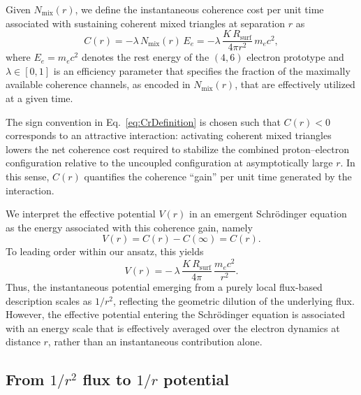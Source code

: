 \documentclass[11pt,a4paper]{article}
\begin{document}
Given $N_{\mathrm{mix}}(r)$, we define the instantaneous coherence cost per unit time associated with sustaining coherent mixed triangles at separation $r$ as
\begin{equation}
C(r) = -\lambda\,N_{\mathrm{mix}}(r)\,E_e = -\lambda\,\frac{K\,R_{\mathrm{surf}}}{4\pi r^{2}}\,m_e c^{2},
\label{eq:CrDefinition}
\end{equation}
where $E_e = m_e c^{2}$ denotes the rest energy of the $(4,6)$ electron prototype and $\lambda \in [0,1]$ is an efficiency parameter that specifies the fraction of the maximally available coherence channels, as encoded in $N_{\mathrm{mix}}(r)$, that are effectively utilized at a given time.\par The sign convention in Eq.~\eqref{eq:CrDefinition} is chosen such that $C(r)<0$ corresponds to an attractive interaction: activating coherent mixed triangles lowers the net coherence cost required to stabilize the combined proton–electron configuration relative to the uncoupled configuration at asymptotically large $r$. In this sense, $C(r)$ quantifies the coherence ``gain'' per unit time generated by the interaction.\par We interpret the effective potential $V(r)$ in an emergent Schr\"odinger equation as the energy associated with this coherence gain, namely
\begin{equation}
V(r) = C(r) - C(\infty) = C(r).
\label{eq:VrEqualsCr}
\end{equation}
To leading order within our ansatz, this yields
\begin{equation}
V(r) = -\,\lambda\,\frac{K\,R_{\mathrm{surf}}}{4\pi}\,\frac{m_e c^{2}}{r^{2}}.
\label{eq:Vr1overr2}
\end{equation}
Thus, the instantaneous potential emerging from a purely local flux-based description scales as $1/r^{2}$, reflecting the geometric dilution of the underlying flux. However, the effective potential entering the Schr\"odinger equation is associated with an energy scale that is effectively averaged over the electron dynamics at distance $r$, rather than an instantaneous contribution alone.

\subsection{From \texorpdfstring{$1/r^{2}$}{1/r²} flux to \texorpdfstring{$1/r$}{1/r} potential}
\end{document}
